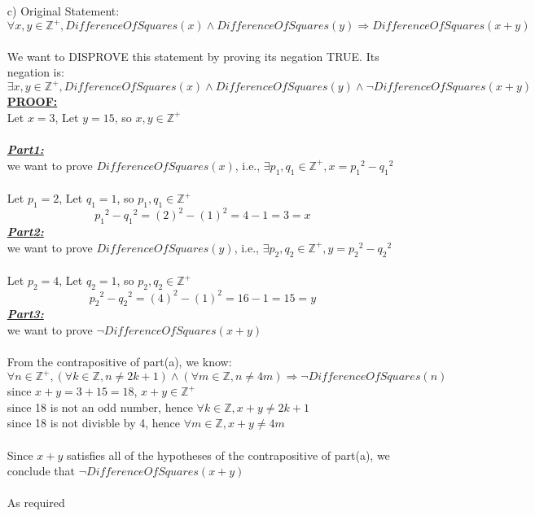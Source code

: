 \documentclass[20pt]{article}
\begin{document}
\begin{enumerate}
    \item[c)] Original Statement:
    \[\forall x, y \in \mathbb{Z^+}, DifferenceOfSquares(x) \land DifferenceOfSquares(y) \Rightarrow DifferenceOfSquares(x+y)\]\\
    We want to DISPROVE this statement by proving its negation TRUE. Its negation is:
    \[\exists x, y \in \mathbb{Z^+}, DifferenceOfSquares(x) \land DifferenceOfSquares(y) \land \neg DifferenceOfSquares(x+y)\]
    \underline{\textbf{PROOF:}}\\
    Let $x = 3$, Let $y = 15$, so $x, y \in \mathbb{Z^+}$\\\\
    \underline{\textbf{\emph{Part1:}}}\\ we want to prove $DifferenceOfSquares(x)$, i.e., $\exists p_1, q_1 \in \mathbb{Z^+}, x = {p_1}^{2} - {q_1}^{2}$ \\\\
    Let $p_1 = 2$, Let $q_1 = 1$, so $p_1, q_1 \in \mathbb{Z^+}$\\
    \[{p_1}^2 - {q_1}^2 = (2)^2 - (1)^2 = 4 - 1 = 3 = x\]
    \underline{\textbf{\emph{Part2:}}}\\ we want to prove $DifferenceOfSquares(y)$, i.e., $\exists p_2, q_2 \in \mathbb{Z^+}, y = {p_2}^2 - {q_2}^2$ \\\\
    Let $p_2 = 4$, Let $q_2 = 1$, so $p_2, q_2 \in \mathbb{Z^+}$
    \[{p_2}^2 - {q_2}^2 = (4)^2 - (1)^2 = 16 - 1 = 15 = y\]
     \underline{\textbf{\emph{Part3:}}}\\ we want to prove $\neg DifferenceOfSquares(x+y)$\\\\
     From the contrapositive of part(a), we know:
     \[\forall n \in \mathbb{Z^+}, (\forall k \in \mathbb{Z}, n \neq 2k + 1) \land (\forall m \in \mathbb{Z}, n \neq 4m) \Rightarrow \neg DifferenceOfSquares(n)\]
     since $x + y = 3 + 15 = 18$, $x + y \in \mathbb{Z^+}$\\
     since 18 is not an odd number, hence $\forall k \in \mathbb{Z}, x + y \neq 2k + 1$\\
     since 18 is not divisble by 4, hence $\forall m \in \mathbb{Z}, x + y \neq 4m$\\\\
     Since $x + y$ satisfies all of the hypotheses of the contrapositive of part(a), we conclude that $\neg DifferenceOfSquares(x+y)$\\\\
     As required \hfill \square
    
\end{enumerate}
\end{document}
